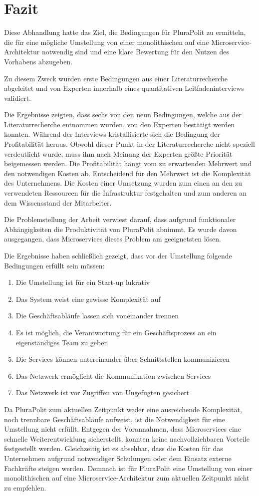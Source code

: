 \section{Fazit}
Diese Abhandlung hatte das Ziel, die Bedingungen für PluraPolit zu ermitteln, die für eine mögliche Umstellung von einer monolithischen auf eine Microservice-Architektur notwendig sind und eine klare Bewertung für den Nutzen des Vorhabens abzugeben. 
 
 Zu diesem Zweck wurden erste Bedingungen aus einer Literaturrecherche abgeleitet und von Experten innerhalb eines quantitativen Leitfadeninterviews validiert.

Die Ergebnisse zeigten, dass sechs von den neun Bedingungen, 
welche aus der Literaturrecherche entnommen wurden, von den Experten bestätigt werden konnten. Während der Interviews kristallisierte sich die Bedingung der Profitabilität heraus. Obwohl dieser Punkt in der Literaturrecherche nicht speziell verdeutlicht wurde, muss ihm nach Meinung der Experten größte Priorität beigemessen werden. Die Profitabilität hängt vom zu erwartenden Mehrwert und den notwendigen Kosten ab. Entscheidend für den Mehrwert ist die Komplexität des Unternehmens. Die Kosten einer Umsetzung wurden zum einen an den zu verwendeten Ressourcen für die Infrastruktur festgehalten und zum anderen an dem Wissensstand der Mitarbeiter.

Die Problemstellung der Arbeit verwiest darauf, dass aufgrund funktionaler Abhängigkeiten die Produktivität von PluraPolit abnimmt. Es wurde davon ausgegangen, dass Microservices dieses Problem am geeignetsten lösen.
 
Die Ergebnisse haben schließlich gezeigt, dass vor der Umstellung folgende Bedingungen erfüllt sein müssen:
\begin{enumerate}
	\item Die Umstellung ist für ein Start-up lukrativ
	\item Das System weist eine gewisse Komplexität auf
	\item Die Geschäftsabläufe lassen sich voneinander trennen
	\item Es ist möglich, die Verantwortung für ein Geschäftsprozess an ein eigenständiges Team zu geben
	\item Die Services können untereinander über Schnittstellen kommunizieren
	\item Das Netzwerk ermöglicht die Kommunikation zwischen Services
	\item Das Netzwerk ist vor Zugriffen von Ungefugten gesichert
\end{enumerate}

Da PluraPolit zum aktuellen Zeitpunkt weder eine ausreichende Komplexität, noch trennbare Geschäftsabläufe aufweist, ist die Notwendigkeit für eine Umstellung nicht erfüllt. Entgegen der Vorannahmen, dass Microservices eine schnelle Weiterentwicklung sicherstellt, konnten keine nachvollziehbaren Vorteile festgestellt werden. Gleichzeitig ist es absehbar, dass die Kosten für das Unternehmen aufgrund notwendiger Schulungen oder dem Einsatz externe Fachkräfte steigen werden. Demnach ist für PluraPolit eine Umstellung von einer monolithischen auf eine Microservice-Architektur zum aktuellen Zeitpunkt nicht zu empfehlen.
